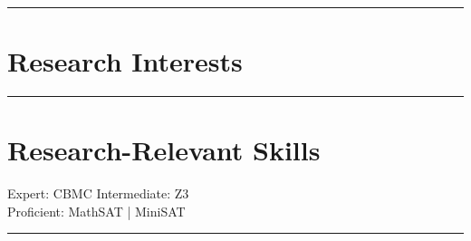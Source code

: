 \documentclass[letterpaper]{Formatting}
\begin{document}
\begin{minipage}[t]{0.3\textwidth}
\sectionspace %
\vspace{-2ex}
\rule{5cm}{0.5pt}
\vspace{2ex}


\section{Research Interests}
\sectionspace %
\vspace{-2ex}
\rule{5cm}{0.5pt}
\vspace{2ex}


\section{Research-Relevant Skills}
Expert: CBMC \textbullet{} Intermediate: Z3\\\vspace{1em}
Proficient: MathSAT | MiniSAT
\sectionspace %
\vspace{-1.5ex}
\rule{5cm}{0.5pt}
\vspace{2ex}




\end{minipage}
\end{document}
